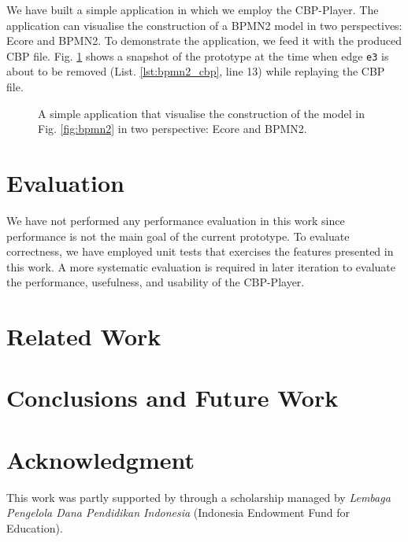 \documentclass[conference]{IEEEtran}
\begin{document}
We have built a simple application in which we employ the CBP-Player. 
The application can visualise the construction of a BPMN2 model in two perspectives: Ecore and BPMN2. 
To demonstrate the application, we feed it with the produced CBP file. 
Fig. \ref{fig:prototype} shows a snapshot of the prototype at the time when edge \texttt{e3} 
is about to be removed (List. \ref{lst:bpmn2_cbp}, line 13) while replaying the CBP file.

\begin{figure}[h]
    \caption{A simple application that visualise the construction of the model in Fig. \ref{fig:bpmn2} in two perspective:
        Ecore and BPMN2.}
    \label{fig:prototype}
\end{figure}

\section{Evaluation}
\label{sec:evaluation}
We have not performed any performance evaluation in this work 
since performance is not the main goal of the current prototype.
To evaluate correctness, we have employed unit tests that exercises the features 
presented in this work. A more systematic evaluation is required in later iteration 
to evaluate the performance, usefulness, and usability of the CBP-Player.

\section{Related Work}
\label{sec:related_work}

\section{Conclusions and Future Work}
\label{sec:conclusions_and_future_work}

\section*{Acknowledgment}
This work was partly supported by through a scholarship managed by \emph{Lembaga Pengelola Dana Pendidikan Indonesia} (Indonesia Endowment Fund for Education).



\end{document}
